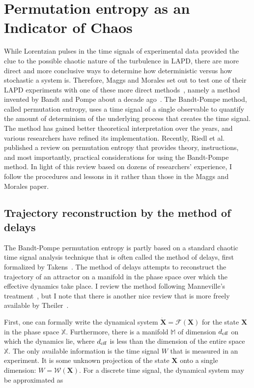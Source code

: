 \section{Permutation entropy as an Indicator of Chaos}
\label{s_ent_comp}

While Lorentzian pulses in the time signals of experimental data provided the clue to the possible chaotic nature of the turbulence in LAPD, there are more direct and more conclusive ways
to determine how deterministic versus how stochastic a system is. Therefore, Maggs and Morales set out to test one of their LAPD experiments with one of these more direct methods~\cite{maggs2013},
namely a method invented by Bandt and Pompe about a decade ago~\cite{bandt2002}. The Bandt-Pompe method, called permutation entropy, uses a
time signal of a single observable to quantify the amount of determinism of the underlying process that creates the time signal. The method has gained better theoretical
interpretation over the years, and various researchers have refined its implementation. Recently, Riedl et al.~\cite{riedle2013} published a review on permutation entropy that provides theory,
instructions, and most importantly, practical considerations for using the Bandt-Pompe method. In light of this review based on dozens of researchers' experience, I follow the procedures and lessons
in it rather than those in the Maggs and Morales paper.

\subsection{Trajectory reconstruction by the method of delays}
\label{ss_delays}

The Bandt-Pompe permutation entropy is partly based on a standard chaotic time signal analysis technique that is often called the method of delays, 
first formalized by Takens~\cite{takens1981}. The method of delays attempts to reconstruct the trajectory of an attractor on a manifold in the phase space over which the effective dynamics
take place. I review the method following Manneville's treatment~\cite{manneville2004}, but I note that there is another nice review that is more freely available by Theiler~\cite{theiler1990}.

First, one can formally write the dynamical system $\mathbf{\dot{X}} = \mathbf{\mathcal{F}} (\mathbf{X})$ for the state $\mathbf{X}$ in the phase space $\mathbb{X}$. Furthermore,
there is a manifold $\mathbb{M}$ of dimension $d_{\rm{eff}}$ on which the dynamics lie, where  $d_{\rm{eff}}$ is less than the dimension of the entire space $\mathbb{X}$. The only available
information is the time signal $W$ that is measured in an experiment. 
It is some unknown projection of the state $\mathbf{X}$ onto a single dimension: $W = \mathcal{W} ({\mathbf{X}})$. 
For a discrete time signal, the dynamical system may be approximated as

